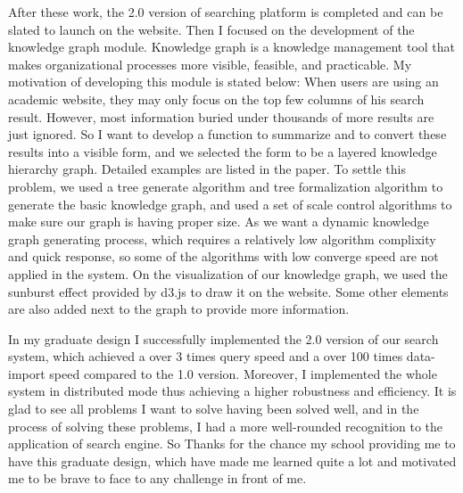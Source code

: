 \begin{bigabstract}
After these work, the 2.0 version of searching platform is completed and can be slated to launch on the website. Then I focused on the development of the knowledge graph module. Knowledge graph is a knowledge management tool that makes organizational processes more visible, feasible, and practicable. My motivation of developing this module is stated below: When users are using an academic website, they may only focus on the top few columns of his search result. However, most information buried under thousands of more results are just ignored. So I want to develop a function to summarize and to convert these results into a visible form, and we selected the form to be a layered knowledge hierarchy graph. Detailed examples are listed in the paper. To settle this problem, we used a tree generate algorithm and tree formalization algorithm to generate the basic knowledge graph, and used a set of scale control algorithms to make sure our graph is having proper size. As we want a dynamic knowledge graph generating process, which requires a relatively low algorithm complixity and quick response, so some of the algorithms with low converge speed are not applied in the system. On the visualization of our knowledge graph, we used the sunburst effect provided by d3.js to draw it on the website. Some other elements are also added next to the graph to provide more information.

In my graduate design I successfully implemented the 2.0 version of our search system, which achieved a over 3 times query speed and a over 100 times data-import speed compared to the 1.0 version. Moreover, I implemented the whole system in distributed mode thus achieving a higher robustness and efficiency. It is glad to see all problems I want to solve having been solved well, and in the process of solving these problems, I had a more well-rounded recognition to the application of search engine. So Thanks for the chance my school providing me to have this graduate design, which have made me learned quite a lot and motivated me to be brave to face to any challenge in front of me.

\end{bigabstract}